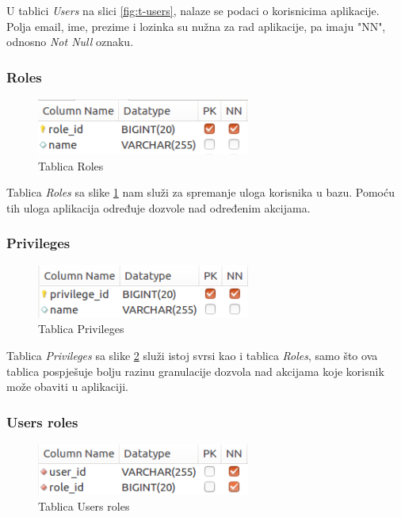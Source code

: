 \documentclass[zavrsni, numeric]{fer}
\begin{document}
U tablici \textit{Users} na slici \ref{fig:t-users}, nalaze se podaci o korisnicima aplikacije. Polja email, ime, prezime i lozinka su nužna za rad aplikacije, pa imaju "NN", odnosno \textit{Not Null} oznaku.

\subsubsection{Roles}

\begin{figure}[H]
	\centering
	\includegraphics[width=7cm]{slike/t-roles.png}
	\caption{Tablica Roles}
	\label{fig:t-roles}
\end{figure}

Tablica \textit{Roles} sa slike \ref{fig:t-roles} nam služi za spremanje uloga korisnika u bazu. Pomoću tih uloga aplikacija određuje dozvole nad određenim akcijama.

\subsubsection{Privileges}

\begin{figure}[H]
	\centering
	\includegraphics[width=7cm]{slike/t-privileges.png}
	\caption{Tablica Privileges}
	\label{fig:t-privileges}
\end{figure}

Tablica \textit{Privileges} sa slike \ref{fig:t-privileges} služi istoj svrsi kao i tablica \textit{Roles}, samo što ova tablica pospješuje bolju razinu granulacije dozvola nad akcijama koje korisnik može obaviti u aplikaciji.

\subsubsection{Users roles}

\begin{figure}[H]
	\centering
	\includegraphics[width=7cm]{slike/t-users_roles.png}
	\caption{Tablica Users roles}
	\label{fig:t-users_roles}
\end{figure}
\end{document}
